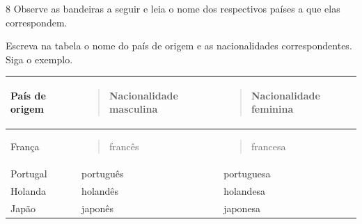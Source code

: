 \num{8} Observe as bandeiras a seguir e leia o nome dos respectivos países a que elas correspondem.

%


Escreva na tabela o nome do país de origem e as nacionalidades correspondentes. Siga o exemplo.

\begin{longtable}[]{@{}lll@{}}
\toprule
\begin{minipage}[b]{0.32\columnwidth}\raggedright\strut
\textbf{País de origem}\strut
\end{minipage} & \begin{minipage}[b]{0.32\columnwidth}\raggedright\strut
\begin{quote}
\textbf{Nacionalidade masculina}
\end{quote}\strut
\end{minipage} & \begin{minipage}[b]{0.32\columnwidth}\raggedright\strut
\begin{quote}
\textbf{Nacionalidade feminina }
\end{quote}\strut
\end{minipage}\tabularnewline
\midrule
\endhead
\begin{minipage}[t]{0.32\columnwidth}\raggedright\strut
França\strut
\end{minipage} & \begin{minipage}[t]{0.32\columnwidth}\raggedright\strut
\begin{quote}
francês
\end{quote}\strut
\end{minipage} & \begin{minipage}[t]{0.32\columnwidth}\raggedright\strut
\begin{quote}
francesa
\end{quote}\strut
\end{minipage}\tabularnewline
Portugal & português & portuguesa\tabularnewline
Holanda & holandês & holandesa\tabularnewline
Japão & japonês & japonesa\tabularnewline
\bottomrule
\end{longtable}

